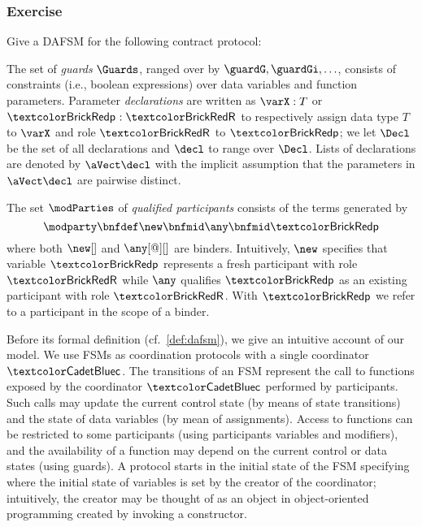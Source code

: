 \begin{frame}
  \frametitle{Exercise}
  Give a DAFSM for the following contract protocol:

\end{frame}




%
%
The set of \emph{guards} $\Guards$, ranged over by
$\guardG,\guardGi, \hdots$, consists of constraints (i.e., boolean
expressions) over data variables and function parameters.
%
Parameter \emph{declarations} are written as $\varX:T$ or
$\partyP:\roleR$ to respectively assign data type $T$ to $\varX$ and
role $\roleR$ to $\partyP$; we let $\Decl$ be the set of all
declarations and $\decl$ to range over $\Decl$.
%
Lists of declarations are denoted by $\aVect\decl$ with the implicit
assumption that the parameters in $\aVect\decl$ are pairwise distinct.

The set $\modParties$ of \emph{qualified participants} consists of the
terms generated by
\[
\modparty \bnfdef \new \bnfmid \any \bnfmid \partyP
\]
where both $\new[]$ and $\any[@][]$ are binders.
%
Intuitively, $\new$ specifies that variable $\partyP$ represents a
fresh participant with role $\roleR$ while $\any$ qualifies $\partyP$
as an existing participant with role $\roleR$.
%
With $\partyP$ we refer to a participant in the scope of a binder.

Before its formal definition (cf.~\cref{def:dafsm}), we give 
an intuitive account of our model.
%
We use FSMs as coordination protocols with a single coordinator~$\contractC$.
%
The transitions of an FSM represent the call to functions exposed by
the coordinator $\contractC$ performed by participants.
%
Such calls may update the current control state (by means of state
transitions)
{ and the state of data variables (by mean of assignments).}
Access to functions can be restricted to some participants (using
participants variables and modifiers), and the availability of a
function may depend on the current control or data states (using
guards).
A protocol starts in the initial state of the FSM specifying where the
initial state of variables is set by the creator of the coordinator;
intuitively, the creator may be thought of as an object in
object-oriented programming created by invoking a constructor.

